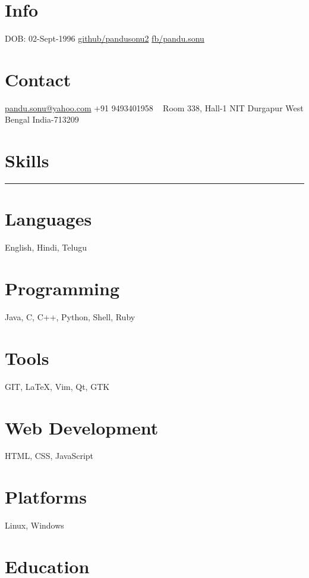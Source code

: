 \documentclass[]{friggeri-cv-a4}
\begin{document}


\begin{aside}
\section{Info}
DOB: 02-Sept-1996
\href{http://github.com/pandusonu2}{github/pandusonu2}
\href{http://www.fb.com/pandu.sonu}{fb/pandu.sonu}

\section{Contact}
\href{mailto:pandu.sonu@yahoo.com}{pandu.sonu@yahoo.com}
+91 9493401958
~
Room 338, Hall-1
NIT Durgapur
West Bengal
India-713209
~
\section{Skills}
\noindent\rule{3cm}{0.5pt}
\section{Languages}
English, Hindi, Telugu
\section{Programming}
Java, C, C++, Python, Shell, Ruby
\section{Tools}
GIT, \LaTeX, Vim, Qt, GTK
\section{Web Development}
HTML, CSS, JavaScript
\section{Platforms}
Linux, Windows
\end{aside}


\section{\normalfont Education}
\end{document}
